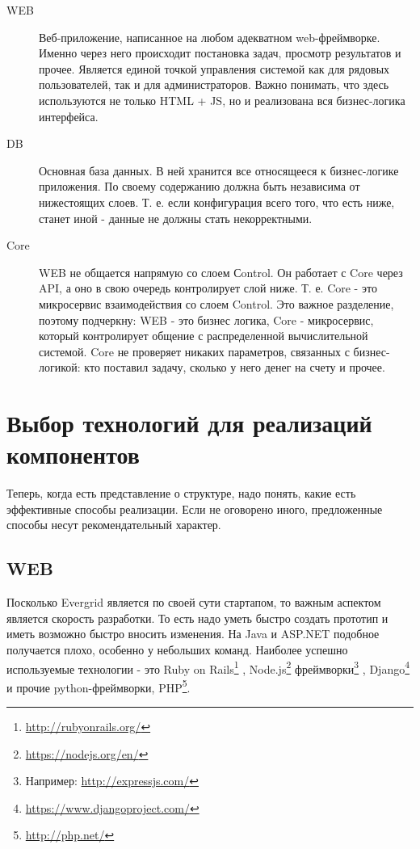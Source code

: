 \begin{description}
  \item[WEB] Веб-приложение, написанное на любом адекватном web-фреймворке. Именно через него происходит постановка задач, просмотр результатов и прочее. Является единой точкой управления системой как для рядовых пользователей, так и для администраторов. Важно понимать, что здесь используются не только HTML + JS, но и реализована вся бизнес-логика интерфейса.
  \item[DB] Основная база данных. В ней хранится все относящееся к бизнес-логике приложения. По своему содержанию должна быть независима от нижестоящих слоев. Т. е. если конфигурация всего того, что есть ниже, станет иной - данные не должны стать некорректными.
  \item[Core] WEB не общается напрямую со слоем Сontrol. Он работает с Core через API, а оно в свою очередь контролирует слой ниже. Т. е. Core - это микросервис взаимодействия со слоем Control. Это важное разделение, поэтому подчеркну: WEB - это бизнес логика, Core - микросервис, который контролирует общение с распределенной вычислительной системой. Core не проверяет никаких параметров, связанных с бизнес-логикой: кто поставил задачу, сколько у него денег на счету и прочее. 
\end{description}

\section{Выбор технологий для реализаций компонентов}

Теперь, когда есть представление о структуре, надо понять, какие есть эффективные способы реализации. Если не оговорено иного, предложенные способы несут рекомендательный характер.

\subsection{WEB}

Посколько Evergrid является по своей сути стартапом, то важным аспектом является скорость разработки. То есть надо уметь быстро создать прототип и иметь возможно быстро вносить изменения. На Java и ASP.NET подобное получается плохо, особенно у небольших команд. Наиболее успешно используемые технологии - это Ruby on Rails\footnote{\url{http://rubyonrails.org/}} , Node.js\footnote{\url{https://nodejs.org/en/}} фреймворки\footnote{Например: \url{http://expressjs.com/}} , Django\footnote{\url{https://www.djangoproject.com/}} и прочие python-фреймворки, PHP\footnote{\url{http://php.net/}}.

